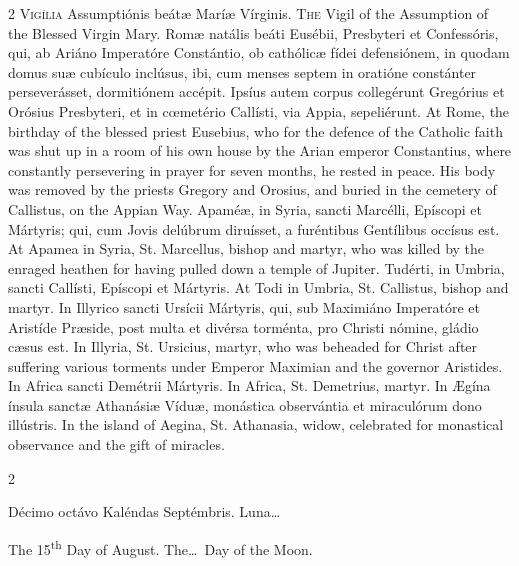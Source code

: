 \begin{paracol}{2}
\lettrine[lines=2]{V}{igília} Assumptiónis 
 beátæ Maríæ Vírginis.
\switchcolumn
{}
\lettrine[lines=2]{T}{he} Vigil of the Assumption of the 
 Blessed Virgin Mary.
\switchcolumn*
{}
Romæ natális beáti 
 Eusébii, Presbyteri et Confessóris, qui, ab Ariáno Imperatóre Constántio, ob 
 cathólicæ fídei defensiónem, in quodam domus suæ cubículo inclúsus, ibi, cum 
 menses septem in oratióne constánter perseverásset, dormitiónem accépit. 
 Ipsíus autem corpus collegérunt Gregórius et Orósius Presbyteri, et in 
 cœmetério Callísti, via Appia, sepeliérunt.
\switchcolumn
{}
At Rome, the birthday of the blessed 
 priest Eusebius, who for the defence of the Catholic faith was shut up in a 
 room of his own house by the Arian emperor Constantius, where constantly 
 persevering in prayer for seven months, he rested in peace. His body 
 was removed by the priests Gregory and Orosius, and buried in the cemetery 
 of Callistus, on the Appian Way.
\switchcolumn*
{}
Apaméæ, in Syria, 
 sancti Marcélli, Epíscopi et Mártyris; qui, cum Jovis delúbrum diruísset, a 
 furéntibus Gentílibus occísus est.
\switchcolumn
{}
At Apamea in Syria, St. Marcellus, 
 bishop and martyr, who was killed by the enraged heathen for having pulled 
 down a temple of Jupiter.
\switchcolumn*
{}
Tudérti, in Umbria, 
 sancti Callísti, Epíscopi et Mártyris.
\switchcolumn
{}
At Todi in Umbria, St. Callistus, 
 bishop and martyr.
\switchcolumn*
{}
In Illyrico sancti 
 Ursícii Mártyris, qui, sub Maximiáno Imperatóre et Aristíde Præside, post 
 multa et divérsa torménta, pro Christi nómine, gládio cæsus est.
\switchcolumn
{}
In Illyria, St. Ursicius, martyr, 
 who was beheaded for Christ after suffering various torments under Emperor 
 Maximian and the governor Aristides.
\switchcolumn*
{}
In Africa sancti 
 Demétrii Mártyris.
\switchcolumn
{}
In Africa, St. Demetrius, martyr.
\switchcolumn*
{}
In Ægína ínsula sanctæ 
 Athanásiæ Víduæ, monástica observántia et miraculórum dono illústris.
\switchcolumn
{}
In the island of Aegina, St. 
 Athanasia, widow, celebrated for monastical observance and the gift of 
 miracles.
\switchcolumn*
{}
\end{paracol}


\begin{paracol}{2}
\begin{center}{\color{gregoriocolor} Décimo octávo Kaléndas Septémbris. 
 Luna\dots\ }\end{center}
\switchcolumn
{}
\begin{center}{\color{gregoriocolor} The 
 15\textsuperscript{th} Day of 
 August. The\dots\ Day of the Moon.}\end{center}
\end{paracol}

